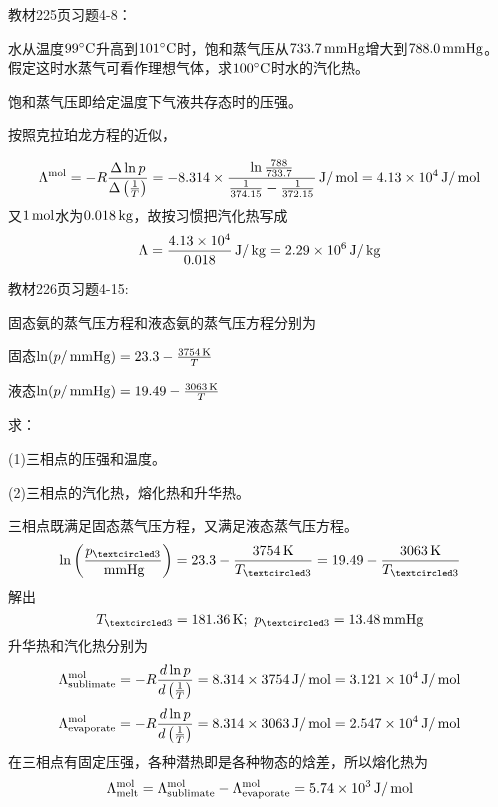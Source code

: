 \documentclass[CJK]{beamer}
\begin{document}
\begin{frame}
  \chtitle{\proid (\sone)}
  \bch
  教材225页习题4-8：

  水从温度$99^\circ \mathrm{C}$升高到$101^\circ \mathrm{C}$时，饱和蒸气压从$733.7\,\mathrm{mmHg}$增大到$788.0\,\mathrm{mmHg}$。假定这时水蒸气可看作理想气体，求$100^\circ \mathrm{C}$时水的汽化热。
  \ech
\end{frame}

\begin{frame}
  \bch
  {\small
  饱和蒸气压即给定温度下气液共存态时的压强。
  
  按照克拉珀龙方程的近似，
  
  $$\Lambda^{\rm mol} = -R \frac{\Delta \ln p}{\Delta\left(\frac{1}{T}\right)} = -8.314 \times \frac{\ln\frac{788}{733.7}}{\frac{1}{374.15}-\frac{1}{372.15}} \,\mathrm{J}/\,\mathrm{mol} = 4.13\times 10^4 \,\mathrm{J}/\,\mathrm{mol}$$
  又$1\,\mathrm{mol}$水为$0.018\,\mathrm{kg}$，故按习惯把汽化热写成
  $$ \Lambda = \frac{4.13\times 10^4}{0.018} \,\mathrm{J}/\,\mathrm{kg} = 2.29\times 10^6 \,\mathrm{J}/\,\mathrm{kg}$$
  }
  \ech
\end{frame}

\begin{frame}
  \chtitle{\proid (\stwo)}
  \bch
  教材226页习题4-15:

  固态氨的蒸气压方程和液态氨的蒸气压方程分别为
  
  固态$\ln(p/\,\mathrm{mmHg}) = 23.3 - \frac{3754\,\mathrm{K}}{T}$

  液态$\ln(p/\,\mathrm{mmHg}) = 19.49 -\frac{3063\,\mathrm{K}}{T}$

  求：

  (1)三相点的压强和温度。

  (2)三相点的汽化热，熔化热和升华热。
  \ech
\end{frame}


\begin{frame}
  \bch
      {\small
        三相点既满足固态蒸气压方程，又满足液态蒸气压方程。
        $$\ln\left(\frac{\pthree}{\SImmHg}\right) = 23.3-\frac{3754\SIK}{\Tthree} = 19.49 - \frac{3063 \SIK}{\Tthree}$$
        解出
        $$\Tthree = 181.36\SIK;\ \pthree = 13.48\SImmHg$$
        升华热和汽化热分别为
        $$\Lambda^{\rm mol}_{\rm sublimate} = - R\frac{d\ln p}{d\left(\frac{1}{T}\right)} =8.314\times 3754\,\mathrm{J}/\,\mathrm{mol} = 3.121\times 10^4 \,\mathrm{J}/\,\mathrm{mol} $$
        $$\Lambda^{\rm mol}_{\rm evaporate} = -R \frac{d\ln p}{d\left(\frac{1}{T}\right)} = 8.314\times 3063\,\mathrm{J}/\,\mathrm{mol} = 2.547\times 10^4 \,\mathrm{J}/\,\mathrm{mol} $$
        在三相点有固定压强，各种潜热即是各种物态的焓差，所以熔化热为
        $$\Lambda^{\rm mol}_{\rm melt} = \Lambda^{\rm mol}_{\rm sublimate} - \Lambda^{\rm mol}_{\rm evaporate} = 5.74 \times 10^3 \,\mathrm{J}/\,\mathrm{mol}$$
        
      }
  \ech
\end{frame}
\end{document}
